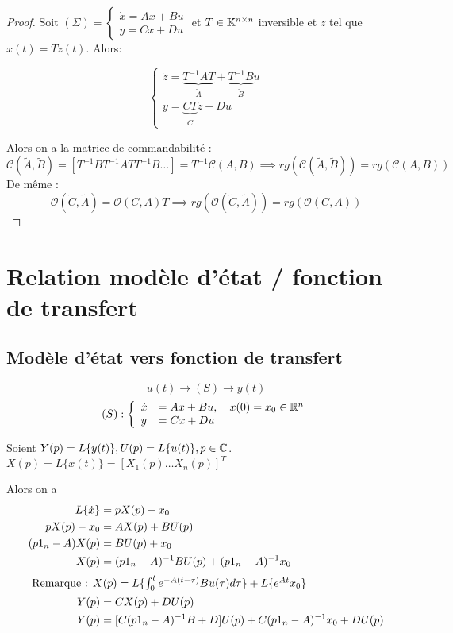 \documentclass[main.tex]{subfiles}
\begin{document}
\begin{proof}
  Soit $(\Sigma) =
  \begin{cases}
    \dot{x} =Ax+Bu \\
    y = Cx+Du
  \end{cases}$
  et $T\in \mathbb{K}^{n\times n}$ inversible et $z$ tel que $x(t)= Tz(t)$. Alors:

\[
  \begin{cases}
    \dot{z} = \underbrace{T^{-1}AT}_{\tilde{A}} + \underbrace{T^{-1}B}_{\tilde{B}}u\\
     y = \underbrace{CT}_{\tilde{C}}z + Du
  \end{cases}
\]

Alors on a la matrice de commandabilité :
\[
\mathcal{C}(\tilde{A},\tilde{B}) = [ T^{-1}B T^{-1}ATT^{-1}B \dots ] = T^{-1} \mathcal{C}(A,B)
\implies rg(\mathcal{C}(\tilde{A},\tilde{B})) = rg(\mathcal{C}(A,B))
\]
De même :
\[
\mathcal{O}(\tilde{C},\tilde{A}) = \mathcal{O}(C,A)T \implies rg(\mathcal{O}(\tilde{C},\tilde{A}))=rg(\mathcal{O}(C,A))
\]

\end{proof}

\section{Relation modèle d'état / fonction de transfert}

\subsection{Modèle d'état vers fonction de transfert}

\[ u(t) \rightarrow \boxed{(S)} \rightarrow y(t) \]
\[ (S) :
\left\{
\begin{array}{ll}
\dot{x} &= Ax + Bu, \quad x(0)=x_0 \in \mathbb{R}^n \\
y & = Cx+Du
\end{array}
\right.
\]

Soient $Y(p) = L\{y(t)\}, U(p) = L\{u(t)\}, p\in \mathbb{C}$. $X(p) = L\{x(t)\} = [X_1(p) \dots X_n(p)]^T$

Alors on a
\begin{align*}
L\{\dot{x}\} & = pX(p) - x_0 \\
pX(p) - x_0 & = AX(p) + BU(p) \\
(p1_n-A)X(p) & = BU(p) + x_0 \\
X(p) & = (p1_n-A)^{-1}BU(p) + (p1_n-A)^{-1}x_0 \\
\intertext{ Remarque : $X(p) = L\{\int_0^t e^{-A(t-\tau)}Bu(\tau)d\tau\} + L\{e^{At}x_0\}$}
Y(p) & = CX(p) + DU(p) \\
Y(p) & = [C(p1_n-A)^{-1}B+D]U(p) + C(p1_n-A)^{-1}x_0 + DU(p)
\end{align*}
\end{document}

